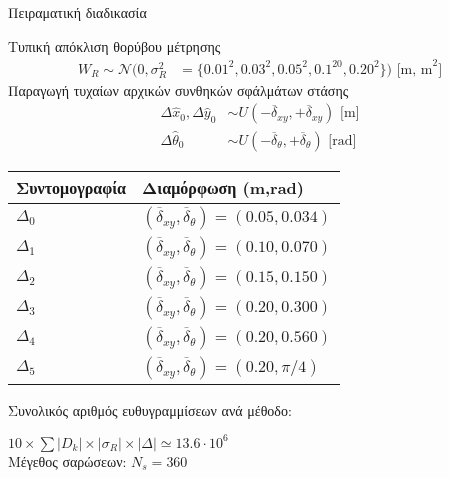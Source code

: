\begin{frame}{Πειραματική διαδικασία}
{\begin{minipage}{\linewidth}
\begin{minipage}{0.56\linewidth}
\begin{bw_box}
        Τυπική απόκλιση θορύβου μέτρησης\vspace{-0.25cm}
      \begin{align}
        W_R \sim \mathcal{N}(0,\sigma_R^2 &= \{0.01^2, 0.03^2, 0.05^2, 0.1^20, 0.20^2\}) \text{ [m, m}^2] \nonumber
      \end{align}
        Παραγωγή τυχαίων αρχικών συνθηκών σφάλμάτων στάσης\vspace{-0.25cm}
      \begin{align}
        \Delta \hat{x}_0,\Delta \hat{y}_0     &\sim U(-\overline{\delta}_{xy},+\overline{\delta}_{xy}) \text{ [m]} \nonumber \\
        \Delta\hat{\theta}_0 &\sim U(-\overline{\delta}_{\theta},+\overline{\delta}_{\theta} )  \text{ [rad]}\nonumber
      \end{align}
        \vspace{-0.8cm}
      \begin{table}\centering
        \begin{tabular}{ll}
        Συντομογραφία         & Διαμόρφωση (m,rad)                                                      \\  \toprule
        $\Delta_0$            & $(\overline{\delta}_{xy}, \overline{\delta}_{\theta}) = (0.05, 0.034)$  \\
        $\Delta_1$            & $(\overline{\delta}_{xy}, \overline{\delta}_{\theta}) = (0.10, 0.070)$  \\
        $\Delta_2$            & $(\overline{\delta}_{xy}, \overline{\delta}_{\theta}) = (0.15, 0.150)$  \\
        $\Delta_3$            & $(\overline{\delta}_{xy}, \overline{\delta}_{\theta}) = (0.20, 0.300)$  \\
        $\Delta_4$            & $(\overline{\delta}_{xy}, \overline{\delta}_{\theta}) = (0.20, 0.560)$  \\
        $\Delta_5$            & $(\overline{\delta}_{xy}, \overline{\delta}_{\theta}) = (0.20, \pi/4)$  \\  \bottomrule
        \end{tabular}
      \end{table}

      Συνολικός αριθμός ευθυγραμμίσεων ανά μέθοδο:

      $10 \times \sum |D_k| \times |\sigma_R| \times |\Delta| \simeq 13.6 \cdot 10^6$\\

      Μέγεθος σαρώσεων: $N_s = 360$\\


\end{bw_box}
\end{minipage}
\end{minipage}}
\end{frame}
